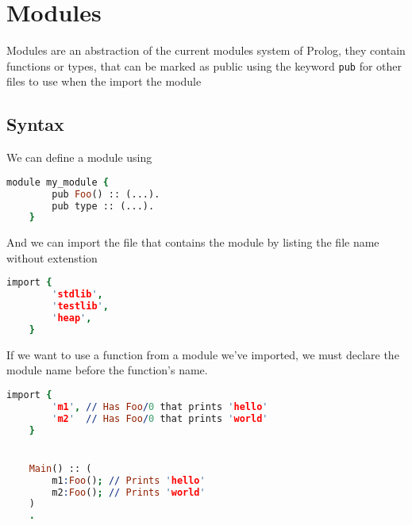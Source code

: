 \section{Modules}

Modules are an abstraction of the current modules system of Prolog, they
contain functions or types, that can be marked as public using the keyword
\texttt{pub} for other files to use when the import the module

\subsection{Syntax}

We can define a module using
\begin{lstlisting}[language =Prolog]
    module my_module {
        pub Foo() :: (...).
        pub type :: (...).
    }
\end{lstlisting}

And we can import the file that contains the module by listing the file name
without extenstion

\begin{lstlisting}[language =Prolog]
    import {
        'stdlib',
        'testlib',
        'heap',
    }
\end{lstlisting}

If we want to use a function from a module we've imported, we must declare 
the module name before the function's name.


\begin{lstlisting}[language =Prolog]
    import {
        'm1', // Has Foo/0 that prints 'hello'
        'm2'  // Has Foo/0 that prints 'world'
    }


    Main() :: (
        m1:Foo(); // Prints 'hello'
        m2:Foo(); // Prints 'world'
    )
    .

\end{lstlisting}





